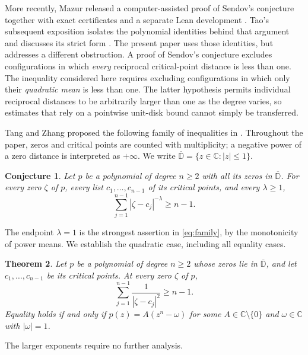 \documentclass[11pt,letterpaper,reqno]{amsart}
\newtheorem{thm}{Theorem}[section]
\newtheorem{conj}[thm]{Conjecture}
\theoremstyle{definition}
\numberwithin{equation}{section}
\newcommand{\D}{\overline{\mathbb D}}
\begin{document}
More recently, Mazur released a computer-assisted proof of Sendov's conjecture together with exact certificates and a separate Lean development \cite[pp.~1--2, Theorem~1.1]{Maz26}. Tao's subsequent exposition isolates the polynomial identities behind that argument and discusses its strict form \cite[Sections~1--4]{Tao26}. The present paper uses those identities, but addresses a different obstruction. A proof of Sendov's conjecture excludes configurations in which \emph{every} reciprocal critical-point distance is less than one. The inequality considered here requires excluding configurations in which only their \emph{quadratic mean} is less than one. The latter hypothesis permits individual reciprocal distances to be arbitrarily larger than one as the degree varies, so estimates that rely on a pointwise unit-disk bound cannot simply be transferred.

Tang and Zhang proposed the following family of inequalities in \cite[p.~5, Conjecture~1.10 and (1.7)]{TZ25}. Throughout the paper, zeros and critical points are counted with multiplicity; a negative power of a zero distance is interpreted as $+\infty$. We write $\D=\{z\in\mathbb C:|z|\le1\}$.

\begin{conj}\label{conj:tz}
Let $p$ be a polynomial of degree $n\ge2$ with all its zeros in $\D$. For every zero $\zeta$ of $p$, every list $c_1,\ldots,c_{n-1}$ of its critical points, and every $\lambda\ge1$,
\begin{equation}\label{eq:family}
 \sum_{j=1}^{n-1}|\zeta-c_j|^{-\lambda}\ge n-1.
\end{equation}
\end{conj}

The endpoint $\lambda=1$ is the strongest assertion in \eqref{eq:family}, by the monotonicity of power means. We establish the quadratic case, including all equality cases.

\begin{thm}\label{thm:main}
Let $p$ be a polynomial of degree $n\ge2$ whose zeros lie in $\D$, and let $c_1,\ldots,c_{n-1}$ be its critical points. At every zero $\zeta$ of $p$,
\begin{equation}\label{eq:main}
 \sum_{j=1}^{n-1}\frac{1}{|\zeta-c_j|^2}\ge n-1.
\end{equation}
Equality holds if and only if $p(z)=A(z^n-\omega)$ for some $A\in\mathbb C\setminus\{0\}$ and $\omega\in\mathbb C$ with $|\omega|=1$.
\end{thm}

The larger exponents require no further analysis.
\end{document}
